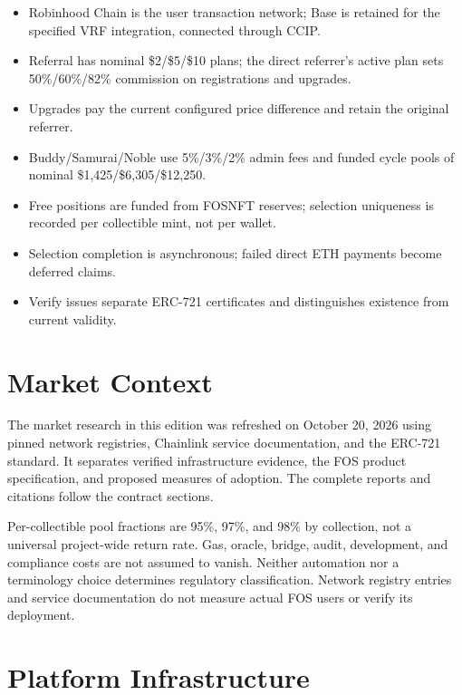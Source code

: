 \documentclass[
  10pt,
  letterpaper,
]{article}
\providecommand{\tightlist}{%
  \setlength{\itemsep}{0pt}\setlength{\parskip}{0pt}}
\begin{document}
\begin{itemize}
\tightlist
\item
  Robinhood Chain is the user transaction network; Base is retained for
  the specified VRF integration, connected through CCIP.
\item
  Referral has nominal \$2/\$5/\$10 plans; the direct referrer's active
  plan sets 50\%/60\%/82\% commission on registrations and upgrades.
\item
  Upgrades pay the current configured price difference and retain the
  original referrer.
\item
  Buddy/Samurai/Noble use 5\%/3\%/2\% admin fees and funded cycle pools
  of nominal \$1,425/\$6,305/\$12,250.
\item
  Free positions are funded from FOSNFT reserves; selection uniqueness
  is recorded per collectible mint, not per wallet.
\item
  Selection completion is asynchronous; failed direct ETH payments
  become deferred claims.
\item
  Verify issues separate ERC-721 certificates and distinguishes
  existence from current validity.
\end{itemize}

\section{Market Context}\label{market-context}

The market research in this edition was refreshed on October 20, 2026
using pinned network registries, Chainlink service documentation, and
the ERC-721 standard. It separates verified infrastructure evidence, the
FOS product specification, and proposed measures of adoption. The
complete reports and citations follow the contract sections.

Per-collectible pool fractions are 95\%, 97\%, and 98\% by collection,
not a universal project-wide return rate. Gas, oracle, bridge, audit,
development, and compliance costs are not assumed to vanish. Neither
automation nor a terminology choice determines regulatory
classification. Network registry entries and service documentation do
not measure actual FOS users or verify its deployment.

\section{Platform Infrastructure}\label{platform-infrastructure}
\end{document}
